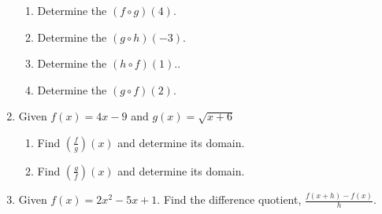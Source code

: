 \begin{enumerate}
\begin{enumerate}
\item Determine the $(f\circ g)(4)$.\vfill
\item Determine the $(g\circ h)(-3)$.\vfill
\item Determine the $(h\circ f)(1)$..\vfill
\item Determine the $(g\circ f)(2)$.\vfill
\end{enumerate}


\clearpage

\item Given $f(x)=4x-9$ and $g(x)=\sqrt{x+6}$
\begin{enumerate}
\item Find $\displaystyle\left(\frac{f}{g}\right)(x)$ and determine its domain.
\vfill
\item Find $\displaystyle\left(\frac{g}{f}\right)(x)$ and determine its domain.
\vfill
\end{enumerate}

\item Given $f(x)=2x^2-5x+1$.  Find the difference quotient, $\displaystyle \frac{f(x+h)-f(x)}{h}$.
\vfill
\vfill



\end{enumerate}





